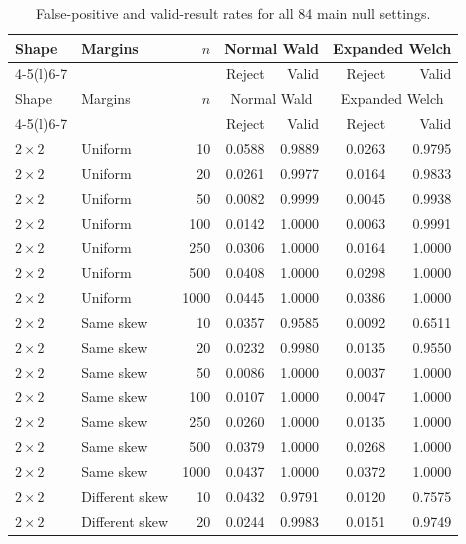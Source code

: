 \begingroup\small
\setlength{\tabcolsep}{4pt}
\begin{longtable}{@{}llrrrrr@{}}
\caption{False-positive and valid-result rates for all 84 main null settings.}
\label{tab:all-main-null}\\
\toprule
Shape & Margins & $n$ & \multicolumn{2}{c}{Normal Wald} & \multicolumn{2}{c}{Expanded Welch}\\
\cmidrule(lr){4-5}\cmidrule(l){6-7}
 & & & Reject & Valid & Reject & Valid\\
\midrule\endfirsthead
\toprule
Shape & Margins & $n$ & \multicolumn{2}{c}{Normal Wald} & \multicolumn{2}{c}{Expanded Welch}\\
\cmidrule(lr){4-5}\cmidrule(l){6-7}
 & & & Reject & Valid & Reject & Valid\\
\midrule\endhead
\(2\times2\) & Uniform & 10 & 0.0588 & 0.9889 & 0.0263 & 0.9795 \\
\(2\times2\) & Uniform & 20 & 0.0261 & 0.9977 & 0.0164 & 0.9833 \\
\(2\times2\) & Uniform & 50 & 0.0082 & 0.9999 & 0.0045 & 0.9938 \\
\(2\times2\) & Uniform & 100 & 0.0142 & 1.0000 & 0.0063 & 0.9991 \\
\(2\times2\) & Uniform & 250 & 0.0306 & 1.0000 & 0.0164 & 1.0000 \\
\(2\times2\) & Uniform & 500 & 0.0408 & 1.0000 & 0.0298 & 1.0000 \\
\(2\times2\) & Uniform & 1000 & 0.0445 & 1.0000 & 0.0386 & 1.0000 \\
\addlinespace
\(2\times2\) & Same skew & 10 & 0.0357 & 0.9585 & 0.0092 & 0.6511 \\
\(2\times2\) & Same skew & 20 & 0.0232 & 0.9980 & 0.0135 & 0.9550 \\
\(2\times2\) & Same skew & 50 & 0.0086 & 1.0000 & 0.0037 & 1.0000 \\
\(2\times2\) & Same skew & 100 & 0.0107 & 1.0000 & 0.0047 & 1.0000 \\
\(2\times2\) & Same skew & 250 & 0.0260 & 1.0000 & 0.0135 & 1.0000 \\
\(2\times2\) & Same skew & 500 & 0.0379 & 1.0000 & 0.0268 & 1.0000 \\
\(2\times2\) & Same skew & 1000 & 0.0437 & 1.0000 & 0.0372 & 1.0000 \\
\addlinespace
\(2\times2\) & Different skew & 10 & 0.0432 & 0.9791 & 0.0120 & 0.7575 \\
\(2\times2\) & Different skew & 20 & 0.0244 & 0.9983 & 0.0151 & 0.9749 \\

\end{longtable}
